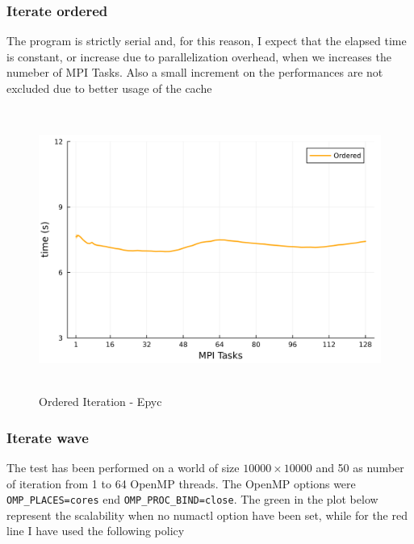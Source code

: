 \documentclass[
  letterpaper,
  DIV=11,
  numbers=noendperiod]{scrartcl}
\begin{document}
\hypertarget{iterate-ordered}{%
\subsubsection{Iterate ordered}\label{iterate-ordered}}

The program is strictly serial and, for this reason, I expect that the
elapsed time is constant, or increase due to parallelization overhead,
when we increases the numeber of MPI Tasks. Also a small increment on
the performances are not excluded due to better usage of the cache

\newpage

\begin{figure}

{\centering \includegraphics[width=\textwidth,height=3.64583in]{img/epyc_ordered.png}

}

\caption{Ordered Iteration - Epyc}

\end{figure}

\hypertarget{iterate-wave}{%
\subsubsection{Iterate wave}\label{iterate-wave}}

The test has been performed on a world of size \(10000 \times 10000\)
and 50 as number of iteration from 1 to 64 OpenMP threads. The OpenMP
options were \texttt{OMP\_PLACES=cores} end
\texttt{OMP\_PROC\_BIND=close}. The green in the plot below represent
the scalability when no numactl option have been set, while for the red
line I have used the following policy
\end{document}
